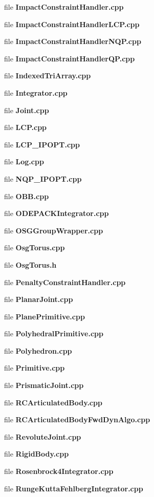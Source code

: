 \begin{DoxyCompactItemize}
file {\bfseries Impact\-Constraint\-Handler.\-cpp}
\item 
file {\bfseries Impact\-Constraint\-Handler\-L\-C\-P.\-cpp}
\item 
file {\bfseries Impact\-Constraint\-Handler\-N\-Q\-P.\-cpp}
\item 
file {\bfseries Impact\-Constraint\-Handler\-Q\-P.\-cpp}
\item 
file {\bfseries Indexed\-Tri\-Array.\-cpp}
\item 
file {\bfseries Integrator.\-cpp}
\item 
file {\bfseries Joint.\-cpp}
\item 
file {\bfseries L\-C\-P.\-cpp}
\item 
file {\bfseries L\-C\-P\-\_\-\-I\-P\-O\-P\-T.\-cpp}
\item 
file {\bfseries Log.\-cpp}
\item 
file {\bfseries N\-Q\-P\-\_\-\-I\-P\-O\-P\-T.\-cpp}
\item 
file {\bfseries O\-B\-B.\-cpp}
\item 
file {\bfseries O\-D\-E\-P\-A\-C\-K\-Integrator.\-cpp}
\item 
file {\bfseries O\-S\-G\-Group\-Wrapper.\-cpp}
\item 
file {\bfseries Osg\-Torus.\-cpp}
\item 
file {\bfseries Osg\-Torus.\-h}
\item 
file {\bfseries Penalty\-Constraint\-Handler.\-cpp}
\item 
file {\bfseries Planar\-Joint.\-cpp}
\item 
file {\bfseries Plane\-Primitive.\-cpp}
\item 
file {\bfseries Polyhedral\-Primitive.\-cpp}
\item 
file {\bfseries Polyhedron.\-cpp}
\item 
file {\bfseries Primitive.\-cpp}
\item 
file {\bfseries Prismatic\-Joint.\-cpp}
\item 
file {\bfseries R\-C\-Articulated\-Body.\-cpp}
\item 
file {\bfseries R\-C\-Articulated\-Body\-Fwd\-Dyn\-Algo.\-cpp}
\item 
file {\bfseries Revolute\-Joint.\-cpp}
\item 
file {\bfseries Rigid\-Body.\-cpp}
\item 
file {\bfseries Rosenbrock4\-Integrator.\-cpp}
\item 
file {\bfseries Runge\-Kutta\-Fehlberg\-Integrator.\-cpp}
\item 

\end{DoxyCompactItemize}
